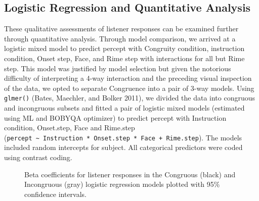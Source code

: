 \documentclass[
  letterpaper,
  DIV=11,
  numbers=noendperiod]{scrartcl}
\begin{document}
\subsection{Logistic Regression and Quantitative
Analysis}\label{sec-results-stats}

These qualitative assessments of listener responses can be examined
further through quantitative analysis. Through model comparison, we
arrived at a logistic mixed model to predict percept with Congruity
condition, instruction condition, Onset step, Face, and Rime step with
interactions for all but Rime step. This model was justified by model
selection but given the notorious difficulty of interpreting a 4-way
interaction and the preceding visual inspection of the data, we opted to
separate Congruence into a pair of 3-way models. Using \texttt{glmer()}
(Bates, Maechler, and Bolker 2011), we divided the data into congruous
and incongruous subsets and fitted a pair of logistic mixed models
(estimated using ML and BOBYQA optimizer) to predict percept with
Instruction condition, Onset.step, Face and Rime.step
(\texttt{percept\ \textasciitilde{}\ Instruction\ *\ Onset.step\ *\ Face\ +\ Rime.step}).
The models included random intercepts for subject. All categorical
predictors were coded using contrast coding.

\begin{figure}


\caption{\label{fig-coefs}Beta coefficients for listener responses in
the Congruous (black) and Incongruous (gray) logistic regression models
plotted with 95\% confidence intervals.}

\end{figure}%
\end{document}
